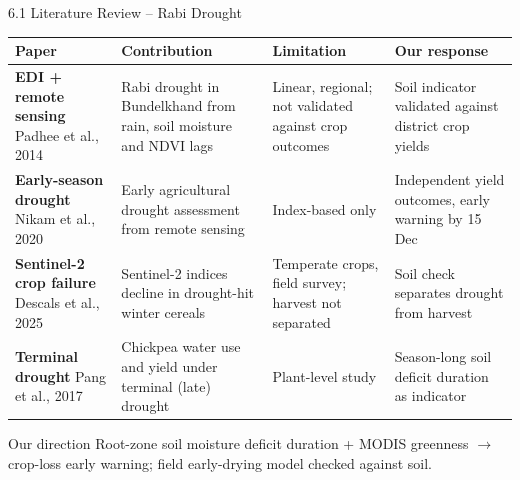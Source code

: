 \documentclass[aspectratio=169,10pt]{beamer}
\begin{document}
\begin{frame}{6.1 Literature Review -- Rabi Drought}
\footnotesize
\renewcommand{\arraystretch}{1.22}
\begin{tabularx}{\textwidth}{|>{\raggedright\arraybackslash}p{3.3cm}|Y|Y|Y|}
\hline
\textbf{Paper} & \textbf{Contribution} & \textbf{Limitation} & \textbf{Our response} \\ \hline
\textbf{EDI + remote sensing} \newline Padhee et al., 2014 & Rabi drought in Bundelkhand from rain, soil moisture and NDVI lags & Linear, regional; not validated against crop outcomes & Soil indicator validated against district crop yields \\ \hline
\textbf{Early-season drought} \newline Nikam et al., 2020 & Early agricultural drought assessment from remote sensing & Index-based only & Independent yield outcomes, early warning by 15 Dec \\ \hline
\textbf{Sentinel-2 crop failure} \newline Descals et al., 2025 & Sentinel-2 indices decline in drought-hit winter cereals & Temperate crops, field survey; harvest not separated & Soil check separates drought from harvest \\ \hline
\textbf{Terminal drought} \newline Pang et al., 2017 & Chickpea water use and yield under terminal (late) drought & Plant-level study & Season-long soil deficit duration as indicator \\ \hline
\end{tabularx}
\begin{card}{Our direction}
\footnotesize Root-zone soil moisture deficit duration + MODIS greenness $\rightarrow$ crop-loss early warning; field early-drying model checked against soil.
\end{card}
\end{frame}
\end{document}
